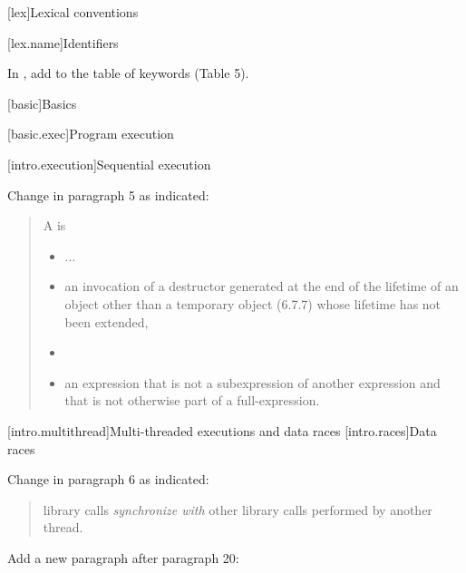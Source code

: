 \setcounter{section}{9}
[lex]{Lexical conventions}


[lex.name]{Identifiers}

In ,
add  to the table of keywords (Table 5).

[basic]{Basics}

\setcounter{section}{8}

[basic.exec]{Program execution}

\setcounter{section}{9}

[intro.execution]{Sequential execution}

Change in  paragraph 5 as indicated:

\begin{quote}
\setcounter{Paras}{4}
\setcounter{Bullets1}{3}
\pnum
A  is

\begin{itemize}
\item
  ...
\item
  an invocation of a destructor generated at the end of the lifetime of
  an object other than a temporary object (6.7.7) whose lifetime has not
  been extended, 
\item
\item
  an expression that is not a subexpression of another expression and
  that is not otherwise part of a full-expression.
\end{itemize}
\end{quote}

[intro.multithread]{Multi-threaded executions and data races}
\setcounter{subsubsection}{1}
[intro.races]{Data races} 

Change in  paragraph 6 as indicated:

\begin{quote}
\setcounter{Paras}{5}
\pnum
{}  library
calls  \emph{synchronize with} other  library calls performed by another thread.
\end{quote}

Add a new paragraph after  paragraph 20:

